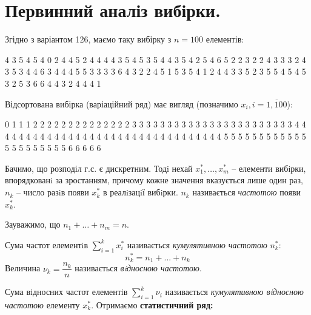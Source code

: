 \documentclass[14pt,a4paper]{scrartcl}
\theoremstyle{definition}
\theoremstyle{remark}
\theoremstyle{definition}
\theoremstyle{definition}
\begin{document}
\section{Первинний аналіз вибірки.}
Згідно з варіантом 126, маємо таку вибірку з $n = 100$ елементів:\par
4 3 5 4 5 4 0 2 4 4 5 2 4 4 4 4 3 5 4 5 3 5 4 4 3 5 4 2 5 4 6 5 2 2 3 2 2 4 3 3 3 2 4 3 5 3 4 4 6 3 4 4 4 5 5 3 3 3 3 6 4 3 2 2 4 5 1 5 3 5 4 1 2 4 4 3 3 5 2 3 5 5 4 5 4 5 3 2 5 3 6 6 4 4 3 2 4 4 4 1\par
Відсортована вибірка (варіаційний ряд) має вигляд (позначимо $ x_i, i = \overline{1, 100} $):\par
0 1 1 1 2 2 2 2 2 2 2 2 2 2 2 2 2 2 3 3 3 3 3 3 3 3 3 3 3 3 3 3 3 3 3 3 3 3 3 3 3 4 4 4 4 4 4 4 4 4 4 4 4 4 4 4 4 4 4 4 4 4 4 4 4 4 4 4 4 4 4 4 4 4 5 5 5 5 5 5 5 5 5 5 5 5 5 5 5 5 5 5 5 5 5 6 6 6 6 6\par
Бачимо, що розподіл г.с. є дискретним. Тодi нехай $x_1^* , \dots , x_m^*$ – елементи вибiрки, впорядкованi
за зростанням, причому кожне значення вказується лише один раз, $n_k$ – число разiв появи $x_k^*$ в реалiзацiї вибiрки.  $n_k$ називається \textit{частотою} появи $x_k^*$.\par
Зауважимо, що $n_1 + \dots + n_m = n$.\par
Сума частот елементiв $ \displaystyle\sum\limits_{i = 1}^{ \textit{k}}{x_i^*}$ називається \textit{кумулятивною частотою} $n_k^*$:
$$
n_k^* = n_1 + ... + n_k
$$
Величина $\nu_k = \dfrac{n_k}{n}$ називається \textit{вiдносною частотою}.\par
Сума вiдносних частот елементiв $\displaystyle  \sum\limits_{i = 1}^{k}{ \nu_i}$ називається \textit{кумулятивною
вiдносною частотою} елементу $x_k^*$. Отримаємо \textbf{статистичний ряд:}
\end{document}
